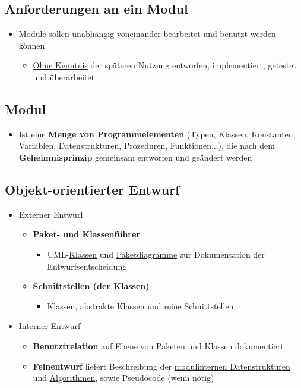\documentclass[parskip=full, 12pt]{scrartcl}
\begin{document}
		\subsection{Anforderungen an ein Modul}
		
			\begin{itemize}
				\item Module sollen unabhängig voneinander bearbeitet und benutzt werden können
				\begin{itemize}
					\item \underline{Ohne Kenntnis} der späteren Nutzung entworfen, implementiert, getestet und überarbeitet
				\end{itemize}
			\end{itemize}
	
		\subsection{Modul}
		
			\begin{itemize}
				\item Ist eine \textbf{Menge von Programmelementen} (Typen, Klassen, Konstanten, Variablen, Datenstrukturen, Prozeduren, Funktionen,..), die nach dem \textbf{Geheimnisprinzip} gemeinsam entworfen und geändert werden
			\end{itemize}
	
		\subsection{Objekt-orientierter Entwurf}
		
			\begin{itemize}
				\item Externer Entwurf
				\begin{itemize}
					\item \textbf{Paket- und Klassenführer}
					\begin{itemize}
						\item UML-\underline{Klassen} und \underline{Paketdiagramme} zur Dokumentation der Entwurfsentscheidung
					\end{itemize}
					\item \textbf{Schnittstellen (der Klassen)}
					\begin{itemize}
						\item Klassen, abstrakte Klassen und reine Schnittstellen
					\end{itemize}
				\end{itemize}
				\item Interner Entwurf
				\begin{itemize}
					\item \textbf{Benutztrelation} auf Ebene von Paketen und Klassen dokumentiert
					\item \textbf{Feinentwurf} liefert Beschreibung der \underline{modulinternen Datenstrukturen} und \underline{Algorithmen}, sowie Pseudocode (wenn nötig)
				\end{itemize}
			\end{itemize}
	
\end{document}
